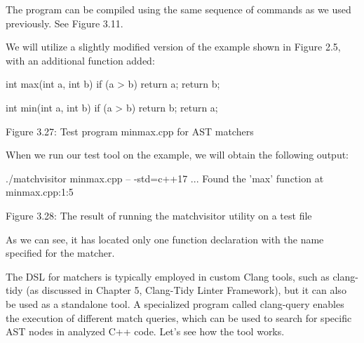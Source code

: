 The program can be compiled using the same sequence of commands as we used previously. See Figure 3.11.

We will utilize a slightly modified version of the example shown in Figure 2.5, with an additional function added:

\begin{cpp}
int max(int a, int b) {
  if (a > b) return a;
    return b;
}

int min(int a, int b) {
  if (a > b) return b;
    return a;
}
\end{cpp}

\begin{center}
Figure 3.27: Test program minmax.cpp for AST matchers
\end{center}

When we run our test tool on the example, we will obtain the following output:

\begin{shell}
./matchvisitor minmax.cpp -- -std=c++17
...
Found the 'max' function at minmax.cpp:1:5
\end{shell}

\begin{center}
Figure 3.28: The result of running the matchvisitor utility on a test file
\end{center}

As we can see, it has located only one function declaration with the name specified for the matcher.

The DSL for matchers is typically employed in custom Clang tools, such as clang-tidy (as discussed in Chapter 5, Clang-Tidy Linter Framework), but it can also be used as a standalone tool. A specialized program called clang-query enables the execution of different match queries, which can be used to search for specific AST nodes in analyzed C++ code. Let's see how the tool works.










































